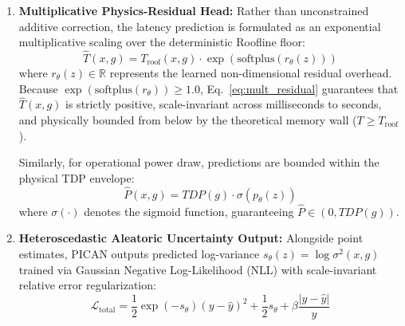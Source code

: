 \documentclass[preprint,12pt]{elsarticle}
\begin{document}
\begin{enumerate}
    \textit{Mathematical Qualification on Pairwise Attention Dynamics:} We explicitly qualify the operational mechanics of Eq.~\eqref{eq:mult_residual} under pairwise evaluation. In standard pairwise inference, each forward pass evaluates a single workload specification $x$ against a single candidate accelerator $g$ ($L_q = 1, L_k = 1$). For a scalar dot-product with key length unity, the softmax normalization evaluates identically to $\mathrm{Softmax}([s]) = 1.0$ for any real scalar $s = Q K^\top / \sqrt{d}$. Consequently, $z_{\text{mca}} = V = W_v h_g$, and gradients to $W_q$ and $W_k$ through the softmax function are zero during pairwise training. Under this pairwise regime, the MCA block functions as a structured bipartite projection and residual fusion layer ($z = \text{LayerNorm}(w_x + W_o W_v h_g)$). As demonstrated in Ablation B (Section \ref{sec:results}), the 33.6\% relative error reduction over a flat MLP (7.02\% vs.\ 10.57\% MdAPE) is driven by the decoupled dual-encoder representation, residual skip connection, and layer normalization, rather than dynamic data-dependent attention re-weighting across multiple hardware tokens. If extended to a list-wise ranking setting where a workload query attends over a sequence of $N$ candidate accelerators ($L_k = |\mathcal{G}| > 1$), the attention mechanism would induce genuine workload-dependent candidate selection weights.
    \item \textbf{Multiplicative Physics-Residual Head:} Rather than unconstrained additive correction, the latency prediction is formulated as an exponential multiplicative scaling over the deterministic Roofline floor:
    \begin{equation}
    \label{eq:mult_residual}
    \hat{T}(x, g) = T_{\text{roof}}(x, g) \cdot \exp\left(\text{softplus}(r_\theta(z))\right)
    \end{equation}
    where $r_\theta(z) \in \mathbb{R}$ represents the learned non-dimensional residual overhead. Because $\exp(\text{softplus}(r_\theta)) \ge 1.0$, Eq.~\eqref{eq:mult_residual} guarantees that $\hat{T}(x, g)$ is strictly positive, scale-invariant across milliseconds to seconds, and physically bounded from below by the theoretical memory wall ($T \ge T_{\text{roof}}$).
    
    Similarly, for operational power draw, predictions are bounded within the physical TDP envelope:
    \begin{equation}
    \hat{P}(x, g) = TDP(g) \cdot \sigma\left(p_\theta(z)\right)
    \end{equation}
    where $\sigma(\cdot)$ denotes the sigmoid function, guaranteeing $\hat{P} \in (0, TDP(g))$.
    \item \textbf{Heteroscedastic Aleatoric Uncertainty Output:} Alongside point estimates, PICAN outputs predicted log-variance $s_\theta(z) = \log \sigma^2(x, g)$ trained via Gaussian Negative Log-Likelihood (NLL) with scale-invariant relative error regularization:
    \begin{equation}
    \mathcal{L}_{\text{total}} = \frac{1}{2} \exp(-s_\theta) (y - \hat{y})^2 + \frac{1}{2} s_\theta + \beta \frac{|y - \hat{y}|}{y}
    \end{equation}
\end{enumerate}
\end{document}
